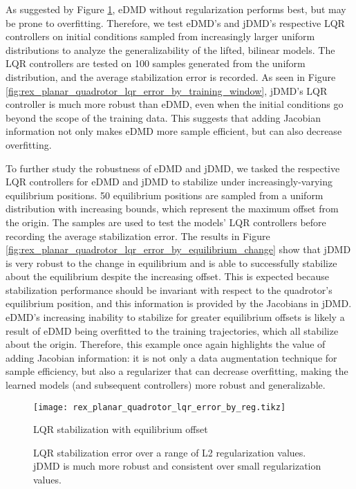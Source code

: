 \documentclass{article}
\begin{document}
As suggested by Figure \ref{fig:rex_planar_quadrotor_lqr_error_by_reg}, eDMD without regularization performs best, but may be prone to overfitting. Therefore, we test eDMD's and jDMD's respective LQR controllers on initial conditions sampled from increasingly larger uniform distributions to analyze the generalizability of the lifted, bilinear models. The LQR controllers are tested on 100 samples generated from the uniform distribution, and the average stabilization error is recorded. As seen in Figure \ref{fig:rex_planar_quadrotor_lqr_error_by_training_window}, jDMD's LQR controller is much more robust than eDMD, even when the initial conditions go beyond the scope of the training data. This suggests that adding Jacobian information not only makes eDMD more sample efficient, but can also decrease overfitting. 

To further study the robustness of eDMD and jDMD, we tasked the respective LQR controllers for eDMD and jDMD to stabilize under increasingly-varying equilibrium positions. 50 equilibrium positions are sampled from a uniform distribution with increasing bounds, which represent the maximum offset from the origin. The samples are used to test the models' LQR controllers before recording the average stabilization error. The results in Figure \ref{fig:rex_planar_quadrotor_lqr_error_by_equilibrium_change} show that jDMD is very robust to the change in equilibrium and is able to successfully stabilize about the equilibrium despite the increasing offset. This is expected because stabilization performance should be invariant with respect to the quadrotor's equilibrium position, and this information is provided by the Jacobians in jDMD. eDMD's increasing inability to stabilize for greater equilibrium offsets is likely a result of eDMD being overfitted to the training trajectories, which all stabilize about the origin. Therefore, this example once again highlights the value of adding Jacobian information: it is not only a data augmentation technique for sample efficiency, but also a regularizer that can decrease overfitting, making the learned models (and subsequent controllers) more robust and generalizable.

\begin{figure}
	\centering
	\texttt{[image: rex\_planar\_quadrotor\_lqr\_error\_by\_reg.tikz]}
	\caption{LQR stabilization with equilibrium offset}
	\label{fig:rex_planar_quadrotor_lqr_error_by_reg}
	\caption{ LQR stabilization error over a range of L2 regularization values. jDMD is much more robust and consistent over small regularization values.}
\end{figure}
\end{document}
